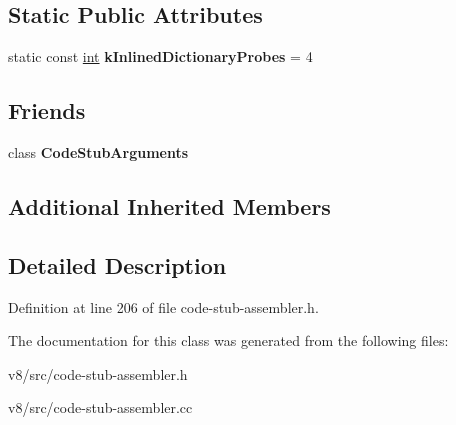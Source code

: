 \subsection*{Static Public Attributes}
\begin{DoxyCompactItemize}
\item 
\mbox{\label{classv8_1_1internal_1_1CodeStubAssembler_a5726ad4bce719d984f89693e2ca43c75}} 
static const \mbox{\hyperlink{classint}{int}} {\bfseries k\+Inlined\+Dictionary\+Probes} = 4
\end{DoxyCompactItemize}
\subsection*{Friends}
\begin{DoxyCompactItemize}
\item 
\mbox{\label{classv8_1_1internal_1_1CodeStubAssembler_a32cecbbadee6b773a4c920b2ac707b84}} 
class {\bfseries Code\+Stub\+Arguments}
\end{DoxyCompactItemize}
\subsection*{Additional Inherited Members}


\subsection{Detailed Description}


Definition at line 206 of file code-\/stub-\/assembler.\+h.



The documentation for this class was generated from the following files\+:\begin{DoxyCompactItemize}
\item 
v8/src/code-\/stub-\/assembler.\+h\item 
v8/src/code-\/stub-\/assembler.\+cc\end{DoxyCompactItemize}
